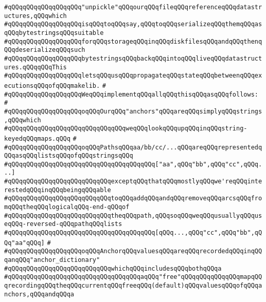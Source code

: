 \verb|#qQQqqQQqqQQqqQQqqQQq"unpickle"qQQqourqQQqfileqQQqreferenceqQQqdatastructures,qQQqwhich|\newline
\verb|#qQQqqQQqqQQqqQQqqQQqisqQQqtoqQQqsay,qQQqtoqQQqserializeqQQqthemqQQqasqQQqbytestringsqQQqsuitable|\newline
\verb|#qQQqqQQqqQQqqQQqqQQqforqQQqstorageqQQqinqQQqdiskfilesqQQqandqQQqthenqQQqdeserializeqQQqsuch|\newline
\verb|#qQQqqQQqqQQqqQQqqQQqbytestringsqQQqbackqQQqintoqQQqliveqQQqdatastructures.qQQqqQQqThis|\newline
\verb|#qQQqqQQqqQQqqQQqqQQqletsqQQqusqQQqpropagateqQQqstateqQQqbetweenqQQqexecutionsqQQqofqQQqmakelib.|\newline
\verb|#|\newline
\verb|#qQQqqQQqqQQqqQQqqQQqWeqQQqimplementqQQqallqQQqthisqQQqasqQQqfollows:|\newline
\verb|#|\newline
\verb|#qQQqqQQqqQQqqQQqqQQqoqQQqOurqQQq"anchors"qQQqareqQQqsimplyqQQqstrings,qQQqwhich|\newline
\verb|#qQQqqQQqqQQqqQQqqQQqqQQqqQQqqQQqweqQQqlookqQQqupqQQqinqQQqstring-keyedqQQqmaps.qQQq|\newline
\verb|#|\newline
\verb|#qQQqqQQqqQQqqQQqqQQqoqQQqPathsqQQqaa/bb/cc/...qQQqareqQQqrepresentedqQQqasqQQqlistsqQQqofqQQqstringsqQQq|\newline
\verb|#qQQqqQQqqQQqqQQqqQQqqQQqqQQqqQQqqQQqqQQq["aa",qQQq"bb",qQQq"cc",qQQq...]|\newline
\verb|#qQQqqQQqqQQqqQQqqQQqqQQqqQQqexceptqQQqthatqQQqmostlyqQQqwe'reqQQqinterestedqQQqinqQQqbeingqQQqable|\newline
\verb|#qQQqqQQqqQQqqQQqqQQqqQQqqQQqtoqQQqaddqQQqandqQQqremoveqQQqarcsqQQqfromqQQqtheqQQqlogicalqQQq-end-qQQqof|\newline
\verb|#qQQqqQQqqQQqqQQqqQQqqQQqqQQqtheqQQqpath,qQQqsoqQQqweqQQqusuallyqQQquseqQQq-reversed-qQQqpathqQQqlists|\newline
\verb|#qQQqqQQqqQQqqQQqqQQqqQQqqQQqqQQqqQQqqQQq[qQQq...,qQQq"cc",qQQq"bb",qQQq"aa"qQQq]|\newline
\verb|#|\newline
\verb|#qQQqqQQqqQQqqQQqqQQqoqQQqAnchorqQQqvaluesqQQqareqQQqrecordedqQQqinqQQqanqQQq"anchor_dictionary"|\newline
\verb|#qQQqqQQqqQQqqQQqqQQqqQQqqQQqwhichqQQqincludesqQQqbothqQQqa|\newline
\verb|#qQQqqQQqqQQqqQQqqQQqqQQqqQQqqQQqqQQqaqQQq"free"qQQqqQQqqQQqqQQqmapqQQqrecordingqQQqtheqQQqcurrentqQQqfreeqQQq(default)qQQqvaluesqQQqofqQQqanchors,qQQqandqQQqa|\newline
